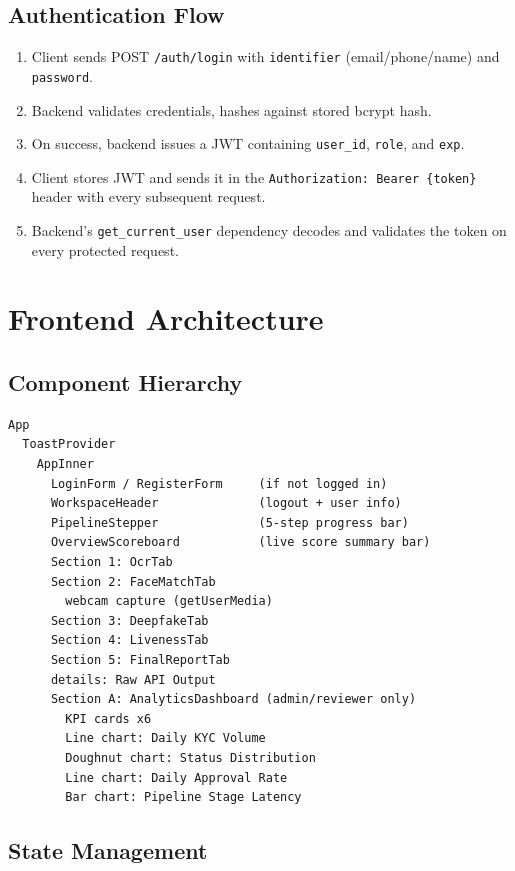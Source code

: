 \subsection{Authentication Flow}
\begin{enumerate}
    \item Client sends POST \texttt{/auth/login} with \texttt{identifier} (email/phone/name) and \texttt{password}.
    \item Backend validates credentials, hashes against stored bcrypt hash.
    \item On success, backend issues a JWT containing \texttt{user\_id}, \texttt{role}, and \texttt{exp}.
    \item Client stores JWT and sends it in the \texttt{Authorization: Bearer \{token\}} header with every subsequent request.
    \item Backend's \texttt{get\_current\_user} dependency decodes and validates the token on every protected request.
\end{enumerate}

\section{Frontend Architecture}

\subsection{Component Hierarchy}

\begin{lstlisting}[style=tsstyle, caption=Frontend Component Tree]
App
  ToastProvider
    AppInner
      LoginForm / RegisterForm     (if not logged in)
      WorkspaceHeader              (logout + user info)
      PipelineStepper              (5-step progress bar)
      OverviewScoreboard           (live score summary bar)
      Section 1: OcrTab
      Section 2: FaceMatchTab
        webcam capture (getUserMedia)
      Section 3: DeepfakeTab
      Section 4: LivenessTab
      Section 5: FinalReportTab
      details: Raw API Output
      Section A: AnalyticsDashboard (admin/reviewer only)
        KPI cards x6
        Line chart: Daily KYC Volume
        Doughnut chart: Status Distribution
        Line chart: Daily Approval Rate
        Bar chart: Pipeline Stage Latency
\end{lstlisting}

\subsection{State Management}

